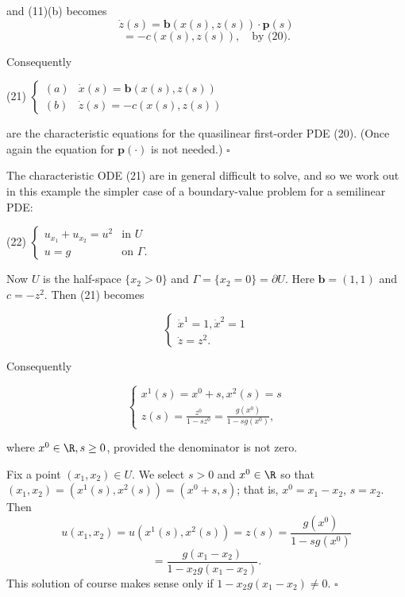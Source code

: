 and (11)(b) becomes
$$\dot{z}(s) = \mathbf{b}(x(s), z(s)) \cdot \mathbf{p}(s)$$
$$= -c(x(s), z(s)), \quad \text{by (20)}.$$

Consequently

(21) \quad $\begin{cases} (a) & \dot{x}(s) = \mathbf{b}(x(s), z(s)) \\ (b) & \dot{z}(s) = -c(x(s), z(s)) \end{cases}$

are the characteristic equations for the quasilinear first-order PDE (20). (Once again the equation for $\mathbf{p}(\cdot)$ is not needed.) $\square$

\begin{example}
\label{ex:semilinear-pde-halfspace-characteristics}
The characteristic ODE (21) are in general difficult to solve, and so we work out in this example the simpler case of a boundary-value problem for a semilinear PDE:

(22) \quad $\begin{cases} u_{x_1} + u_{x_2} = u^2 & \text{in } U \\ u = g & \text{on } \Gamma. \end{cases}$

Now $U$ is the half-space $\{x_2 > 0\}$ and $\Gamma = \{x_2 = 0\} = \partial U$. Here $\mathbf{b} = (1, 1)$ and $c = -z^2$. Then (21) becomes

$$\begin{cases} \dot{x}^1 = 1, \dot{x}^2 = 1 \\ \dot{z} = z^2. \end{cases}$$

Consequently

$$\begin{cases} x^1(s) = x^0 + s, x^2(s) = s \\ z(s) = \frac{z^0}{1 - sz^0} = \frac{g(x^0)}{1 - sg(x^0)}, \end{cases}$$

where $x^0 \in \R, s \geq 0$, provided the denominator is not zero.

Fix a point $(x_1, x_2) \in U$. We select $s > 0$ and $x^0 \in \R$ so that $(x_1, x_2) = (x^1(s), x^2(s)) = (x^0 + s, s)$; that is, $x^0 = x_1 - x_2$, $s = x_2$. Then
$$u(x_1,x_2) = u(x^1(s), x^2(s)) = z(s) = \frac{g(x^0)}{1 - sg(x^0)}$$
$$= \frac{g(x_1-x_2)}{1-x_2 g(x_1-x_2)}.$$
This solution of course makes sense only if $1 - x_2 g(x_1-x_2) \neq 0$. $\square$
\end{example}

